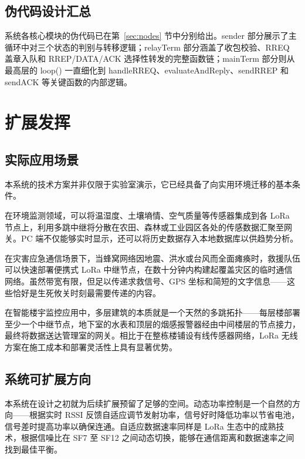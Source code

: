 \documentclass[12pt,a4paper]{ctexart}
\begin{document}
\subsection{伪代码设计汇总}

系统各核心模块的伪代码已在第~\ref{sec:nodes} 节中分别给出。sender 部分展示了主循环中对三个状态的判别与转移逻辑；relayTerm 部分涵盖了收包校验、RREQ 盖章入队和 RREP/DATA/ACK 选择性转发的完整函数链；mainTerm 部分则从最高层的 loop() 一直细化到 handleRREQ、evaluateAndReply、sendRREP 和 sendACK 等关键函数的内部逻辑。

\section{扩展发挥}
\label{sec:extension}

\subsection{实际应用场景}

本系统的技术方案并非仅限于实验室演示，它已经具备了向实用环境迁移的基本条件。

在环境监测领域，可以将温湿度、土壤墒情、空气质量等传感器集成到各 LoRa 节点上，利用多跳中继将分散在农田、森林或工业园区各处的传感数据汇聚至网关。PC 端不仅能够实时显示，还可以将历史数据存入本地数据库以供趋势分析。

在灾害应急通信场景下，当蜂窝网络因地震、洪水或台风而全面瘫痪时，救援队伍可以快速部署便携式 LoRa 中继节点，在数十分钟内构建起覆盖灾区的临时通信网络。虽然带宽有限，但足以传递求救信号、GPS 坐标和简短的文字信息——这些恰好是生死攸关时刻最需要传递的内容。

在智能楼宇监控应用中，多层建筑的本质就是一个天然的多跳拓扑——每层楼部署至少一个中继节点，地下室的水表和顶层的烟感报警器经由中间楼层的节点接力，最终将数据送达管理室的网关。相比于在整栋楼铺设有线传感器网络，LoRa 无线方案在施工成本和部署灵活性上具有显著优势。

\subsection{系统可扩展方向}

本系统在设计之初就为后续扩展预留了足够的空间。动态功率控制是一个自然的方向——根据实时 RSSI 反馈自适应调节发射功率，信号好时降低功率以节省电池，信号差时提高功率以确保连通。自适应数据速率同样是 LoRa 生态中的成熟技术，根据信噪比在 SF7 至 SF12 之间动态切换，能够在通信距离和数据速率之间找到最佳平衡。
\end{document}
